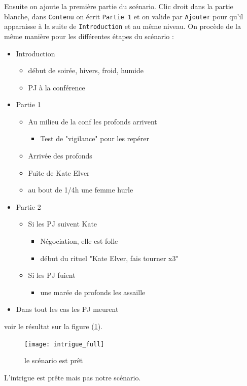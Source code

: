 \documentclass[a4paper,12pt]{article}
\newcommand*{\interfaceitem}[1]{\texttt{#1}}
\begin{document}
Ensuite on ajoute la première partie du scénario. Clic droit dans la partie blanche, dans \interfaceitem{Contenu} on écrit \interfaceitem{Partie 1} et on valide par \interfaceitem{Ajouter} pour qu'il apparaisse à la suite de \interfaceitem{Introduction} et au même niveau.
On procède de la même manière pour les différentes étapes du scénario :
\begin{itemize}
    \item Introduction
    \begin{itemize}
        \item début de soirée, hivers, froid, humide
        \item PJ à la conférence
    \end{itemize}
    \item Partie 1
    \begin{itemize}
        \item Au milieu de la conf les profonds arrivent
        \begin{itemize}
            \item Test de "vigilance" pour les repérer
        \end{itemize}
        \item Arrivée des profonds
        \item Fuite de Kate Elver
        \item au bout de 1/4h une femme hurle
    \end{itemize}
    \item Partie 2
    \begin{itemize}
        \item Si les PJ suivent Kate
        \begin{itemize}
            \item Négociation, elle est folle
            \item début du rituel "Kate Elver, fais tourner x3"
        \end{itemize}
        \item Si les PJ fuient
        \begin{itemize}
            \item une marée de profonds les assaille
        \end{itemize}
    \end{itemize}
    \item Dans tout les cas les PJ meurent
\end{itemize}
voir le résultat sur la figure (\ref{intrigue_full}).  
\begin{figure}[h!]
    \texttt{[image: intrigue\_full]}
    \caption{le scénario est prêt}
    \label{intrigue_full}
\end{figure}    
L'intrigue est prête mais pas notre scénario.
\end{document}
